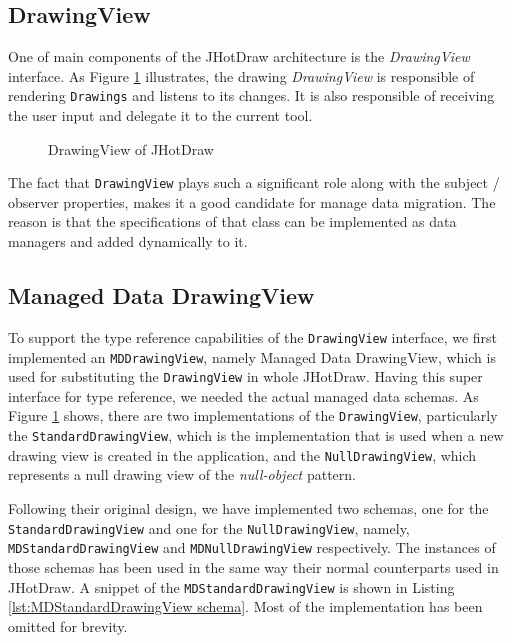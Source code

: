\subsection{DrawingView}
One of main components of the JHotDraw architecture is the \textit{DrawingView} interface.
As Figure \ref{fig:JHotDraw_DrawingView} illustrates, the drawing \textit{DrawingView} is responsible of rendering \texttt{Drawings} and listens to its changes.
It is also responsible of receiving the user input and delegate it to the current tool.

\begin{figure}[H]
	\centering
  	\caption{DrawingView of JHotDraw}
  	\label{fig:JHotDraw_DrawingView}
\end{figure}

The fact that \texttt{DrawingView} plays such a significant role along with the subject / observer properties, makes it a good candidate for manage data migration.
The reason is that the specifications of that class can be implemented as data managers and added dynamically to it.

\subsection{Managed Data DrawingView}
To support the type reference capabilities of the \texttt{DrawingView} interface, we first implemented an \texttt{MDDrawingView}, namely Managed Data DrawingView, which is used for substituting the \texttt{DrawingView} in whole JHotDraw.
Having this super interface for type reference, we needed the actual managed data schemas.
As Figure \ref{fig:JHotDraw_DrawingView} shows, there are two implementations of the \texttt{DrawingView}, particularly the \texttt{StandardDrawingView}, which is the implementation that is used when a new drawing view is created in the application, and the \texttt{NullDrawingView}, which represents a null drawing view of the \textit{null-object} pattern.

Following their original design, we have implemented two schemas, one for the \texttt{StandardDrawingView} and one for the \texttt{NullDrawingView}, namely, \texttt{MDStandardDrawingView} and \texttt{MDNullDrawingView} respectively.
The instances of those schemas has been used in the same way their normal counterparts used in JHotDraw.
A snippet of the \texttt{MDStandardDrawingView} is shown in Listing \ref{lst:MDStandardDrawingView schema}.
Most of the implementation has been omitted for brevity.

